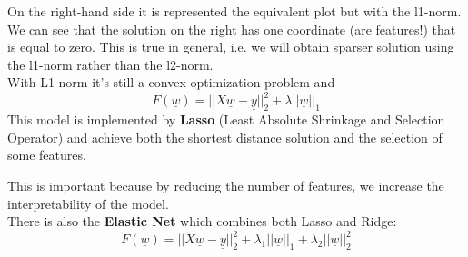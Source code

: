 On the right-hand side it is represented the equivalent plot but with the l1-norm. We can see that the solution on the right has one coordinate (are features!) that is equal to zero. This is true in general, i.e. we will obtain sparser solution using the l1-norm rather than the l2-norm.\\
With L1-norm it's still a convex optimization problem and
\[
    F(\underline{w}) = ||X\underline{w} - \underline{y}||_2^2 + \lambda ||\underline{w}||_1    
\] 
This model is implemented by \textbf{Lasso} (Least Absolute Shrinkage and Selection Operator) and achieve both the shortest distance solution and the selection of some features.

This is important because by reducing the number of features, we increase the interpretability of the model.\\

There is also the \textbf{Elastic Net} which combines both Lasso and Ridge: 
\[
    F(\underline{w}) = ||X\underline{w} - \underline{y}||_2^2 + \lambda_1||\underline{w}||_1 + \lambda_2||\underline{w}||_2^2  
\] 

